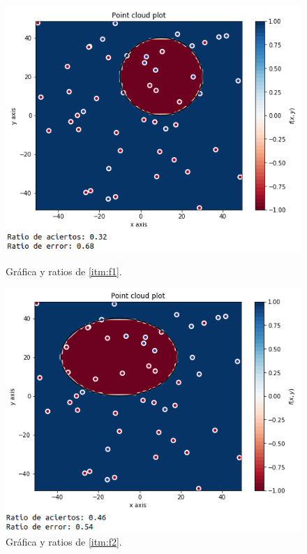 \documentclass[11pt,a4paper]{article}
\begin{document}
\begin{figure}[H]
\centering
\begin{minipage}{.5\textwidth}
	\centering
	\includegraphics[scale=0.35]{img/f1.png}
	\caption{Gráfica y ratios de \ref{itm:f1}.}
\end{minipage}%
\begin{minipage}{.5\textwidth}
	\centering
	\includegraphics[scale=0.35]{img/f2.png}
	\caption{Gráfica y ratios de \ref{itm:f2}.}
\end{minipage}
\end{figure}
\end{document}
